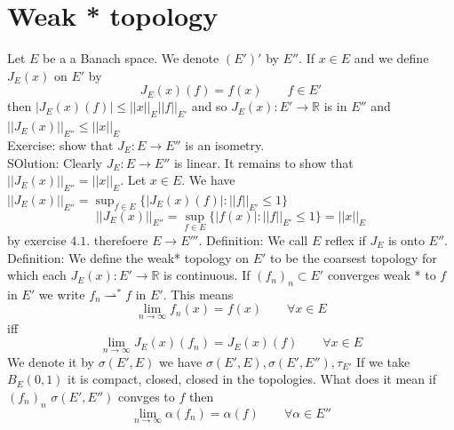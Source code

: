 \documentclass[11pt]{article}
\begin{document}
\section{Weak * topology}
Let $E$ be a a Banach space. We denote $(E')'$ by  $E''$. If  $x \in E$ and we define  $J_E(x)$ on  $E'$ by
 \[
J_E(x) (f) = f(x) \qquad f \in E'
\] 
then $|J_E(x)(f)| \le ||x||_{E} ||f||_{E'}$
and so $J_E(x): E' \rightarrow \mathbb{R}$ is in $ E''$ and $||J_E(x)||_{E''} \le ||x||_E$
\\
Exercise: show that $J_E : E \rightarrow E''$ is an isometry.\\
SOlution: Clearly $J_E : E \rightarrow E''$ is linear. It remains to show that $||J_E(x)||_{E''} = ||x||_E$.
Let  $x \in E$. We have  $||J_E(x)||_{E''} = \sup_{f \in E}\{ |J_E(x)(f)| : ||f||_{E'} \le 1\}$
 \[
     ||J_E(x)||_{E''} = \sup_{f \in E} \{|f(x)| : ||f||_{E'} \le 1\} = ||x||_{E}
\] 
by exercise $4.1$. therefoere  $E \rightarrow E'''$.
Definition: We call $E$ reflex if $J_E$ is onto $E''$.
\\
Definition: We define the weak* topology on $E'$ to be the coarsest topology for which each $J_E(x) : E' \rightarrow  \mathbb{R}$ is continuous.
If $(f_n)_n \subset E'$ converges weak * to $f$ in $E'$ we write  $f_n \rightharpoonup^{*} f$ in $E'$. This means
 \[
\lim_{n\to \infty} f_n(x) = f(x) \qquad \forall x \in E
\] 
iff
\[
\lim_{n\to \infty}J_E(x)(f_n) = J_E(x)(f) \qquad \forall x \in E
\] 
We denote it by $\sigma(E', E)$
we have $\sigma(E', E), \sigma(E', E''), \tau_{E'}$
If we take $B_E(0,1)$ it is compact, closed, closed in the topologies.
What does it mean if $(f_n)_n$  $\sigma(E', E'')$ convges to $f$ then
\[
\lim_{n\to \infty} \alpha(f_n) = \alpha(f) \qquad \forall \alpha \in E''
\] 
\end{document}
